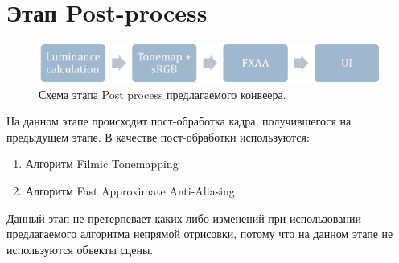 \section{Этап Post-process} \label{ch3:post_process}
	\begin{figure}[ht!] 
		\center
		\includegraphics [scale=0.4] {my_folder/images//postprocess_schema}	
		\caption{Схема этапа Post process предлагаемого конвеера.} 
		\label{fig:renderpass_schema}
	\end{figure}
	
	На данном этапе происходит пост-обработка кадра, получившегося на предыдущем этапе. В качестве пост-обработки используются:
	\begin{enumerate}[1.]
		\item Алгоритм Filmic Tonemapping\cite{hable2010uncharted, dillereal}
		\item Алгоритм Fast Approximate Anti-Aliasing\cite{lottes2009fast}
	\end{enumerate}

	Данный этап не претерпевает каких-либо изменений при использовании предлагаемого алгоритма непрямой отрисовки, потому что на данном этапе не используются объекты сцены.